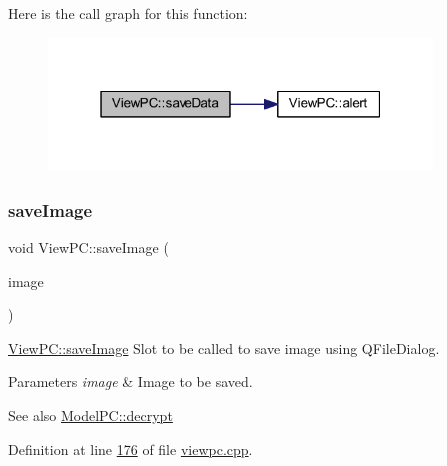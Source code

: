Here is the call graph for this function\+:
\nopagebreak
\begin{figure}[H]
\begin{center}
\leavevmode
\includegraphics[width=289pt]{class_view_p_c_aaff156103970be7c777beedaf0020604_cgraph}
\end{center}
\end{figure}
\mbox{\label{class_view_p_c_a7901ce10ffaaf2387bef1db7feea342d}} 
\subsubsection{\texorpdfstring{save\+Image}{saveImage}}
{\footnotesize\ttfamily void View\+P\+C\+::save\+Image (\begin{DoxyParamCaption}\item[{Q\+Image $\ast$}]{image }\end{DoxyParamCaption})\hspace{0.3cm}{\ttfamily [slot]}}



\mbox{\hyperlink{class_view_p_c_a7901ce10ffaaf2387bef1db7feea342d}{View\+P\+C\+::save\+Image}} Slot to be called to save image using Q\+File\+Dialog. 


\begin{DoxyParams}{Parameters}
{\em image} & Image to be saved. \\
\hline
\end{DoxyParams}
\begin{DoxySeeAlso}{See also}
\mbox{\hyperlink{class_model_p_c_af1f0b21565bf39808c4cdd448fad0ea8}{Model\+P\+C\+::decrypt}} 
\end{DoxySeeAlso}


Definition at line \mbox{\hyperlink{viewpc_8cpp_source_l00176}{176}} of file \mbox{\hyperlink{viewpc_8cpp_source}{viewpc.\+cpp}}.

